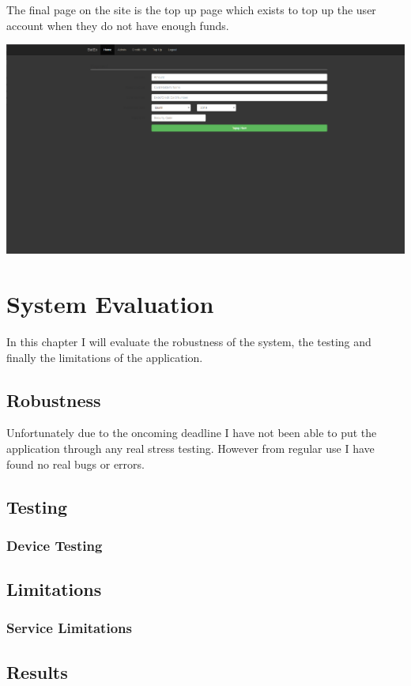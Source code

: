 The final page on the site is the top up page which exists to top up the user account when they do not have enough funds.

\includegraphics[width=\textwidth,height=\textheight,keepaspectratio]{img/screenshots/topup.png}

\chapter{System Evaluation}
In this chapter I will evaluate the robustness of the system, the testing and finally the limitations of the application.

\section{Robustness}
Unfortunately due to the oncoming deadline I have not been able to put the application through any real stress testing. However from regular use I have found no real bugs or errors.

\section{Testing}
\subsection{Device Testing}

\section{Limitations}
\subsection{Service Limitations}

\section{Results}

